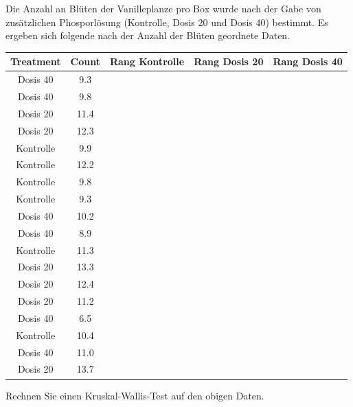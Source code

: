 \documentclass[a4paper, 9pt]{scrartcl}\usepackage[]{graphicx}\usepackage[]{xcolor}
\newenvironment{knitrout}{}{} %
\begin{document}
Die Anzahl an Bl{\"u}ten der Vanilleplanze pro Box wurde nach der Gabe von
zus{\"a}tzlichen Phosporl{\"o}sung (Kontrolle, Dosis 20 und Dosis 40) bestimmt. Es
ergeben sich folgende nach der Anzahl der Bl{\"u}ten geordnete Daten.

\begin{knitrout}
\color{fgcolor}\begin{table}[!h]
\centering
\begin{tabular}{ccccc}
\toprule
Treatment & Count & Rang Kontrolle & Rang Dosis 20 & Rang Dosis 40\\
\midrule
Dosis 40 & 9.3 &  &  & \\
Dosis 40 & 9.8 &  &  & \\
Dosis 20 & 11.4 &  &  & \\
Dosis 20 & 12.3 &  &  & \\
Kontrolle & 9.9 &  &  & \\
\addlinespace
Kontrolle & 12.2 &  &  & \\
Kontrolle & 9.8 &  &  & \\
Kontrolle & 9.3 &  &  & \\
Dosis 40 & 10.2 &  &  & \\
Dosis 40 & 8.9 &  &  & \\
\addlinespace
Kontrolle & 11.3 &  &  & \\
Dosis 20 & 13.3 &  &  & \\
Dosis 20 & 12.4 &  &  & \\
Dosis 20 & 11.2 &  &  & \\
Dosis 40 & 6.5 &  &  & \\
\addlinespace
Kontrolle & 10.4 &  &  & \\
Dosis 40 & 11.0 &  &  & \\
Dosis 20 & 13.7 &  &  & \\
\bottomrule
\end{tabular}
\end{table}

\end{knitrout}

Rechnen Sie einen Kruskal-Wallis-Test auf den obigen Daten.
\end{document}
